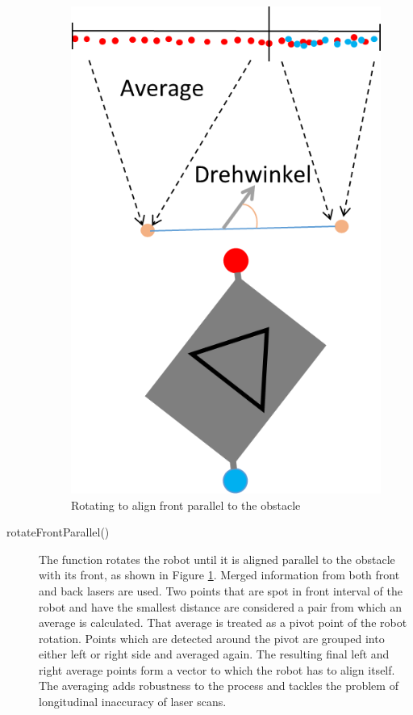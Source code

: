 \begin{description}
\begin{figure}[ht]
\centering
\includegraphics[scale=0.6]{graphics/front_parallel.png}
\caption{Rotating to align front parallel to the obstacle}
\label{parallel}
\centering
\end{figure} 
 
\item[rotateFrontParallel()] The function rotates the robot until it is aligned parallel to the obstacle with its front, as shown in Figure \ref{parallel}. Merged information from both front and back lasers are used. Two points that are spot in front interval of the robot and have the smallest distance are considered a pair from which an average is calculated. That average is treated as a pivot point of the robot rotation. Points which are detected around the pivot are grouped into either left or right side and averaged again. The resulting final left and right average points form a vector to which the robot has to align itself. The averaging adds robustness to the process and tackles the problem of longitudinal inaccuracy of laser scans.
\end{description}


